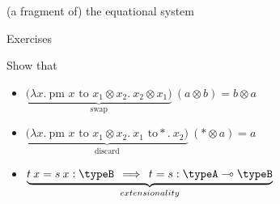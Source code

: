 \documentclass{beamer}
\begin{document}
\begin{frame}{(a fragment of) the equational system}
\end{frame}

\begin{frame}{Exercises}

        Show that
        \begin{itemize}
                \item $\underbrace{\Big ( \lambda x. \> \text{pm } x \text{ to } x_1 \otimes x_2. 
                        \> x_2 \otimes x_1 \Big )}_{\text{swap}} \> (a \otimes b) = b \otimes a$
                \item $\underbrace{\Big ( \lambda x. \> \text{pm } x \text{ to } x_1 \otimes x_2. 
                        \> x_1 \text{ to} \ast. \> x_2 \Big )}_{\text{discard}} \> (\ast \otimes a) =  a$
                \item $\underbrace{t \> x = s \> x : \typeB 
                        \> \> \Longrightarrow \> \> t = s : \typeA \multimap \typeB}_{extensionality}$
        \end{itemize}
\end{frame}
\end{document}
